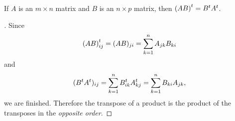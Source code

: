 \begin{eg}\label{2.3.2}
  If \(A\) is an \(m \times n\) matrix and \(B\) is an \(n \times p\) matrix, then \({(AB)}^{t} = {B}^{t} {A}^{t}\).
\end{eg}

\begin{proof}[]
  Since
  \[
    {(AB)}^{t}_{i j} = (AB)_{j i} = \sum_{k = 1}^n A_{j k} B_{k i}
  \]
  and
  \[
    ({B}^{t} {A}^{t})_{i j} = \sum_{k = 1}^n {B}^{t}_{i k} {A}^{t}_{k j} = \sum_{k = 1}^n B_{k i} A_{j k},
  \]
  we are finished.
  Therefore the transpose of a product is the product of the transposes in the \emph{opposite order}.
\end{proof}

